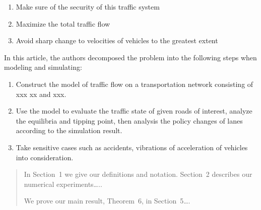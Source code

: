 \documentclass{icmmcm}
\begin{document}
\begin{enumerate}
\item Make sure of the security of this traffic system
\item Maximize the total traffic flow 
\item Avoid sharp change to velocities of vehicles to the greatest extent
\end{enumerate}
In this article, the authors decomposed the problem into the following steps when modeling and simulating:
\begin{enumerate}
\item Construct the model of traffic flow on a transportation network consisting of xxx xx and xxx.
\item Use the model to  evaluate the traffic state of given roads of interest, analyze the equilibria and tipping point, then analysis the policy changes of lanes according to the simulation result.
\item Take sensitive cases such as accidents, vibrations of acceleration of vehicles into consideration.
\end{enumerate}
\begin{quotation}
  In Section~1 we give our definitions and notation. Section~2
  describes our numerical experiments\ldots{}..
  
  We prove our main result, Theorem~6, in Section~5\ldots{}.
\end{quotation}
\end{document}
